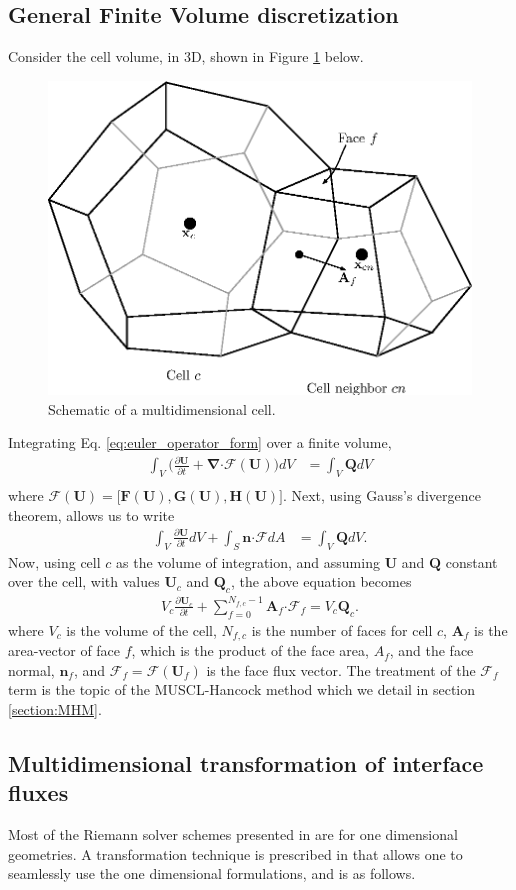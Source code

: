 \documentclass[10pt,letterpaper,notitlepage]{article}
\numberwithin{equation}{section}
\newcommand{\partialderiv}[2]{\frac{\partial #1}{\partial #2}}
\newcommand{\bnabla}{\boldsymbol{\nabla}}
\newcommand{\dotp}{\boldsymbol{\cdot}}
\newcommand{\beqn}{\begin{equation}\begin{aligned}}
\newcommand{\eeqn}{\end{aligned}\end{equation}}
\begin{document}
\vspace{1cm}
\subsection{General Finite Volume discretization}
Consider the cell volume, in 3D, shown in Figure \ref{fig:faceorientation} below.
\begin{figure}[H]
\centering
\includegraphics[width=0.5\linewidth]{figures/FaceOrientation}
\caption{Schematic of a multidimensional cell.}
\label{fig:faceorientation}
\end{figure}

\noindent
Integrating Eq. \eqref{eq:euler_operator_form} over a finite volume,
\beqn 
\int_V \biggr( 
\partialderiv{\mathbf{U}}{t} + 
\bnabla \dotp \mathcal{F}(\mathbf{U})
\biggr) dV &= 
\int_V \mathbf{Q} dV \\
\eeqn 
where $\mathcal{F} (\mathbf{U}) = \big[
\mathbf{F}(\mathbf{U}),
\mathbf{G}(\mathbf{U}), 
\mathbf{H}(\mathbf{U})
\big]$. Next, using Gauss's divergence theorem, allows us to write
\beqn
\int_V \partialderiv{\mathbf{U}}{t}  dV 
+ 
\int_S \mathbf{n} \dotp \mathcal{F}  dA &= 
\int_V \mathbf{Q} dV .
\eeqn 
Now, using cell $c$ as the volume of integration, and assuming $\mathbf{U}$ and $\mathbf{Q}$ constant over the cell, with values $\mathbf{U}_c$ and $\mathbf{Q}_c$, the above equation becomes
\beqn \label{eq:general_finite_volume}
V_c \partialderiv{\mathbf{U}_c}{t} 
+ 
\sum_{f=0}^{N_{f,c}{-}1} 
\mathbf{A}_f \dotp \mathcal{F}_f
= 
V_c \mathbf{Q}_c.
\eeqn 
where $V_c$ is the volume of the cell, $N_{f,c}$ is the number of faces for cell $c$, $\mathbf{A}_f$ is the area-vector of face $f$, which is the product of the face area, $A_f$, and the face normal, $\mathbf{n}_f$, and $\mathcal{F}_f = \mathcal{F}(\mathbf{U}_f)$ is the face flux vector.  The treatment of the $\mathcal{F}_f$ term is the topic of the MUSCL-Hancock method which we detail in section \ref{section:MHM}.

\vspace{1cm}
\subsection{Multidimensional transformation of interface fluxes}
Most of the Riemann solver schemes presented in \cite{Toro} are for one dimensional geometries. A transformation technique is prescribed in \cite{Toro} that allows one to seamlessly use the one dimensional formulations, and is as follows. 
\end{document}
